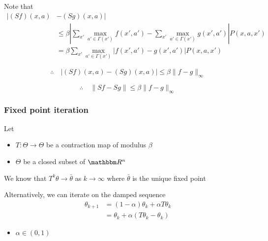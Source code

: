 \documentclass[xcolor=dvipsnames]{beamer}  %
\renewcommand{\leq}{\leqslant}
\newcommand{\fore}{\therefore \quad}
\newcommand{\1}{\mathbbm 1}
\newcommand{\RR}{\mathbbm R}
\begin{document}
\begin{frame}
    
    Note that
    \begin{align*}
        |(S f)(x,a) & - (S g)(x,a)|
        \\
        & \leq \beta
        \left|
            \sum_{x'} \max_{a' \in \Gamma(x')} f(x',a')
            - \sum_{x'} \max_{a' \in \Gamma(x')} g(x',a')
        \right| P(x,a,x')
        \\
        & = \beta
            \sum_{x'}
            \max_{a' \in \Gamma(x')}
        \left|
              f(x',a')
            -  g(x',a')
        \right| P(x,a,x')
    \end{align*}

    \begin{equation*}
        \fore
        |(S f)(x,a) - (S g)(x,a)|
        \leq \beta \| f - g\|_\infty
    \end{equation*}

    \begin{equation*}
        \fore
        \|S f - S g\| \leq \beta \| f - g\|_\infty
    \end{equation*}

\end{frame}

\begin{frame}
    \frametitle{Fixed point iteration}

    Let 
    \begin{itemize}
        \item $T \colon \Theta \to \Theta$ be a contraction map of modulus $\beta$
        \item $\Theta$ be a closed subset of $\RR^n$
    \end{itemize}

    \vspace{0.5em}
    \vspace{0.5em}
    We know that $T^k \theta \to \bar \theta$ as $k \to \infty$ where $\bar
    \theta$ is the
    unique fixed point

    \vspace{0.5em}
    Alternatively, we can iterate on the damped sequence
    \begin{align*}
        \theta_{k+1} 
        & = (1-\alpha) \theta_k + \alpha T \theta_k
        \\
        & =  \theta_k + \alpha (T \theta_k - \theta_k)
    \end{align*}

    \begin{itemize}
        \item $\alpha \in (0,1)$
    \end{itemize}

\end{frame}
\end{document}

